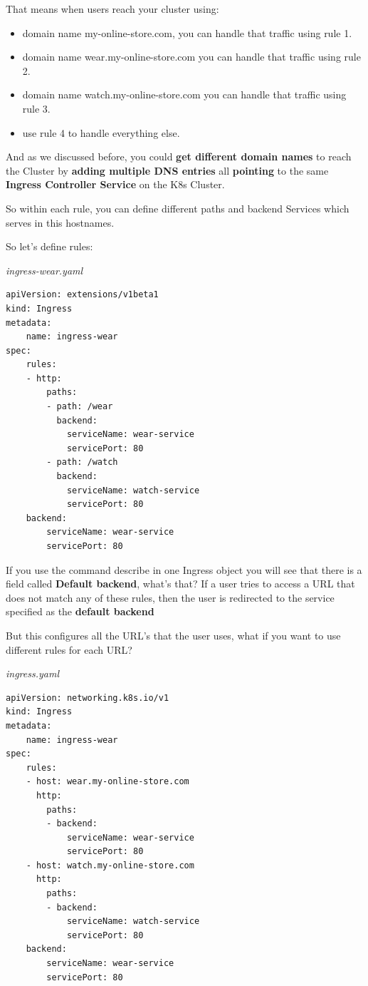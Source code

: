 \documentclass{article}
\newenvironment{blocktemplate}[1]{%
    \tcolorbox[beamer,%
    noparskip,breakable,
    colframe=Blue,%
    colbacklower=LimeGreen!75!LightGreen,%
    title=#1]}%
    {\endtcolorbox}
\newenvironment{codetemplate}[1][]{%
  \mybasecolorbox[#1]
  \itshape
}{%
  \endmybasecolorbox
}
\begin{document}
That means when users reach your cluster using:

\begin{itemize}
    \item domain name my-online-store.com, you can handle that traffic using rule 1.
    \item domain name wear.my-online-store.com you can handle that traffic using rule 2.
    \item domain name watch.my-online-store.com you can handle that traffic using rule 3.
    \item use rule 4 to handle everything else.
\end{itemize}

And as we discussed before, you could\textbf{ get different domain names} to reach the Cluster by \textbf{adding multiple DNS entries} all \textbf{pointing} to the same \textbf{Ingress Controller Service} on the K8s Cluster.

So within each rule, you can define different paths and backend Services which serves in this hostnames.

So let's define rules:

\begin{codetemplate}{ingress-wear.yaml}
\begin{verbatim}
apiVersion: extensions/v1beta1
kind: Ingress
metadata:
    name: ingress-wear
spec:
    rules:
    - http:
        paths:
        - path: /wear
          backend:
            serviceName: wear-service
            servicePort: 80
        - path: /watch
          backend:
            serviceName: watch-service
            servicePort: 80 
    backend:
        serviceName: wear-service
        servicePort: 80
\end{verbatim}
\end{codetemplate}

\begin{blocktemplate}{NOTE}
If you use the command describe in one Ingress object you will see that there is a field called \textbf{Default backend}, what's that? If a user tries to access a URL that does not match any of these rules, then the user is redirected to the service specified as the \textbf{default backend}
\end{blocktemplate}

But this configures all the URL's that the user uses, what if you want to use different rules for each URL?

\begin{codetemplate}{ingress.yaml}
\begin{verbatim}
apiVersion: networking.k8s.io/v1
kind: Ingress
metadata:
    name: ingress-wear
spec:
    rules:
    - host: wear.my-online-store.com
      http:
        paths:
        - backend:
            serviceName: wear-service
            servicePort: 80
    - host: watch.my-online-store.com
      http: 
        paths:
        - backend:
            serviceName: watch-service
            servicePort: 80
    backend:
        serviceName: wear-service
        servicePort: 80
\end{verbatim}
\end{codetemplate}
\end{document}
